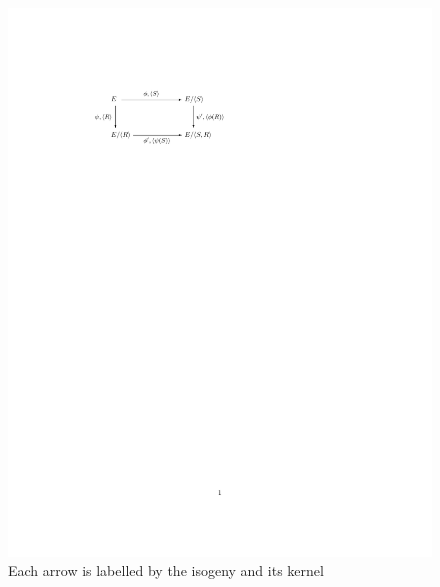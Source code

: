 \documentclass{amsart}
\theoremstyle{plain}
\theoremstyle{remark}
\numberwithin{equation}{section}
\begin{document}
\ifx %
\begin{figure}[ht]\label{FigZKP}
\centering
\includegraphics[trim= 120 595 300 120, clip=true]{zkpdiagram.pdf}
\begin{center} \caption{Each arrow is labelled by the isogeny and its kernel}
\end{center}
\end{figure}
\fi
\end{document}
